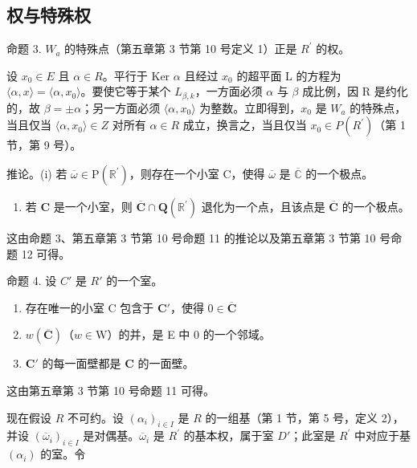 \subsection{权与特殊权}

命题 3. \(W_{a}\) 的特殊点（第五章第 3 节第 10 号定义 1）正是 \(R^{\prime}\) 的权。

设 \(x_0 \in E\) 且 \(\alpha \in R\)。平行于 Ker \(\alpha\) 且经过 \(x_0\) 的超平面 L 的方程为 \(\langle \alpha, x \rangle = \langle \alpha, x_0 \rangle\)。要使它等于某个 \(L_{\beta,k}\)，一方面必须 \(\alpha\) 与 \(\beta\) 成比例，因 R 是约化的，故 \(\beta = \pm \alpha\)；另一方面必须 \(\langle \alpha, x_0 \rangle\) 为整数。立即得到，\(x_0\) 是 \(W_a\) 的特殊点，当且仅当 \(\langle \alpha, x_0 \rangle \in Z\) 对所有 \(\alpha \in R\) 成立，换言之，当且仅当 \(x_0 \in P(R^{\prime})\)（第 1 节，第 9 号）。

推论。(i) 若 \(\overline{\omega} \in \mathrm{P}(\mathbb{R}^{\prime})\)，则存在一个小室 C，使得 \(\overline{\omega}\) 是 \(\overline{\mathbb{C}}\) 的一个极点。

\begin{enumerate}
\def\labelenumi{(\roman{enumi})}
\setcounter{enumi}{1}
\tightlist
\item
  若 \(\mathbf{C}\) 是一个小室，则 \(\overline{\mathbf{C}} \cap \mathbf{Q}(\mathbb{R}^{\prime})\) 退化为一个点，且该点是 \(\overline{\mathbf{C}}\) 的一个极点。
\end{enumerate}

这由命题 3、第五章第 3 节第 10 号命题 11 的推论以及第五章第 3 节第 10 号命题 12 可得。

命题 4. 设 \(C'\) 是 \(R'\) 的一个室。

\begin{enumerate}
\def\labelenumi{(\roman{enumi})}
\item
  存在唯一的小室 C 包含于 \(\mathbf{C}'\)，使得 \(0\in \overline{\mathbf{C}}\)
\item
  \(w(\overline{\mathbf{C}})\)（\(w\in \mathrm{W}\)）的并，是 E 中 0 的一个邻域。
\item
  \(\mathbf{C}'\) 的每一面壁都是 \(\mathbf{C}\) 的一面壁。
\end{enumerate}

这由第五章第 3 节第 10 号命题 11 可得。

现在假设 \(R\) 不可约。设 \((\alpha_i)_{i\in I}\) 是 \(R\) 的一组基（第 1 节，第 5 号，定义 2），并设 \((\overline{\omega}_i)_{i\in I}\) 是对偶基。\(\overline{\omega}_i\) 是 \(R^{\prime}\) 的基本权，属于室 \(D'\)；此室是 \(R^{\prime}\) 中对应于基 \((\alpha_i)\) 的室。令

